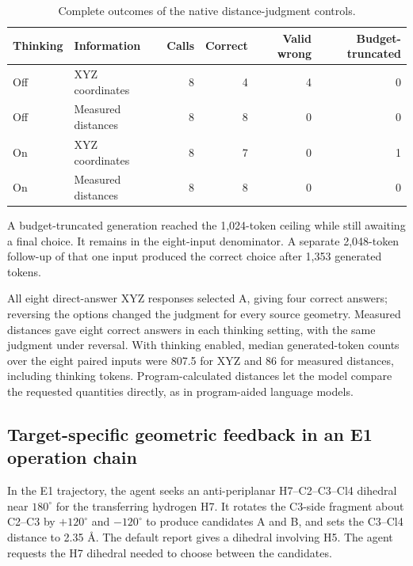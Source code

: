 \begin{table}[!htbp]
\centering\small
\caption{Complete outcomes of the native distance-judgment controls.}
\label{tab:si-distance-outcomes}
\begin{tabular}{llrrrr}
\toprule
Thinking & Information & Calls & Correct & Valid wrong & Budget-truncated\\
\midrule
Off & XYZ coordinates & 8 & 4 & 4 & 0\\
Off & Measured distances & 8 & 8 & 0 & 0\\
On & XYZ coordinates & 8 & 7 & 0 & 1\\
On & Measured distances & 8 & 8 & 0 & 0\\
\bottomrule
\end{tabular}
\par\smallskip\begin{minipage}{\linewidth}\footnotesize
A budget-truncated generation reached the 1,024-token ceiling while still awaiting a final choice. It remains in the eight-input denominator. A separate 2,048-token follow-up of that one input produced the correct choice after 1,353 generated tokens.
\end{minipage}
\end{table}

All eight direct-answer XYZ responses selected A, giving four correct answers; reversing the options changed the judgment for every source geometry. Measured distances gave eight correct answers in each thinking setting, with the same judgment under reversal. With thinking enabled, median generated-token counts over the eight paired inputs were 807.5 for XYZ and 86 for measured distances, including thinking tokens. Program-calculated distances let the model compare the requested quantities directly, as in program-aided language models.\citep{ref15}

\subsection{Target-specific geometric feedback in an E1 operation chain}

In the E1 trajectory, the agent seeks an anti-periplanar H7--C2--C3--Cl4 dihedral near $180^\circ$ for the transferring hydrogen H7. It rotates the C3-side fragment about C2--C3 by $+120^\circ$ and $-120^\circ$ to produce candidates A and B, and sets the C3--Cl4 distance to 2.35 \AA. The default report gives a dihedral involving H5. The agent requests the H7 dihedral needed to choose between the candidates.

